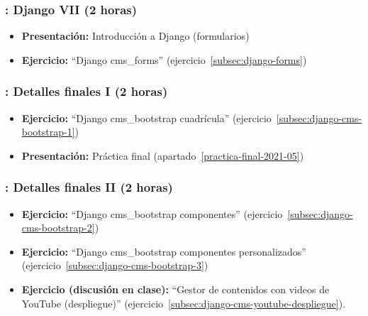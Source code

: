 \documentclass[a4paper,12pt]{article}
\begin{document}
\subsubsection{\lunesL: Django VII (2 horas)}
\label{cal:lunesL}

\begin{itemize}
  \item \textbf{Presentación:} Introducción a Django (formularios)
  \item \textbf{Ejercicio:} ``Django cms\_forms'' (ejercicio~\ref{subsec:django-forms}) \\
\end{itemize}



 \subsubsection{\juevesX: Detalles finales I  (2 horas)}
 \label{cal:juevesO}

 \begin{itemize}
   \item \textbf{Ejercicio:} ``Django cms\_bootstrap cuadrícula'' (ejercicio~\ref{subsec:django-cms-bootstrap-1})
   \item \textbf{Presentación:} Práctica final (apartado~\ref{practica-final-2021-05})
\end{itemize}

\subsubsection{\lunesX: Detalles finales II (2 horas)}
\label{cal:lunesM}

\begin{itemize}
   \item \textbf{Ejercicio:} ``Django cms\_bootstrap componentes'' (ejercicio~\ref{subsec:django-cms-bootstrap-2})
\item \textbf{Ejercicio:} ``Django cms\_bootstrap componentes personalizados'' (ejercicio~\ref{subsec:django-cms-bootstrap-3})
\item \textbf{Ejercicio (discusión en clase):} ``Gestor de contenidos con videos de YouTube (despliegue)'' (ejercicio~\ref{subsec:django-cms-youtube-despliegue}).
\end{itemize}
\end{document}
